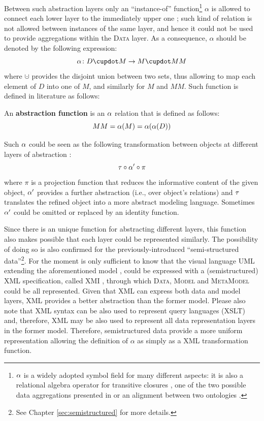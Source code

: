 Between such abstraction layers only an ``instance-of'' function\footnote{$\abstr$ is a widely adopted symbol field for many different aspects: it is also a relational algebra operator for transitive closures \cite{Alpha}, one of the two possible data aggregations presented in \cite{Johnson2011} or an alignment between two ontologies \cite{euzenat2013d}.} $\alpha$ is allowed to connect  each lower layer to the  immediately upper one \cite{mathmeta}; such kind of relation is not allowed  between instances of the same layer, and hence it could not be used to provide aggregations within the \textsc{Data} layer. As a consequence, $\alpha$ should be denoted by the following expression:
\[\abstr\colon \data\cupdot \model \to \model\cupdot \metamodel\]
where $\cupdot$ provides the disjoint union between two sets, thus allowing to map each element of $D$ into one of $M$, and similarly for $M$ and $MM$. Such function is defined in literature as follows:

\begin{definition}
	An \textbf{abstraction function} is an $\abstrTHIS$   relation that is
	defined as follows:
	\begin{equation}\label{eq:alayer}\metamodel=\abstr(\model)=\abstr(\abstr(\data))\end{equation}

	Such $\abstr$ could be seen as the following transformation between
	objects at different layers of abstraction \cite{kuhne06a}:
	\begin{equation}\label{eq:alpha}
	\ttransl \circ\abstr'\circ\pi
	\end{equation}
	where $\pi$ is a projection function that reduces the informative content of the
	given object, $\abstr'$ provides a further abstraction (i.e.,\; over object's
	relations) and $\ttransl$ translates the refined object into a more abstract
	modeling language. Sometimes \cite{kuhne06a} $\abstr'$ could be omitted or
	replaced by an identity function.
\end{definition}

Since there is an unique function for abstracting different layers, this function also makes possible that each layer could be represented similarly. The possibility of doing so is also confirmed for the previously-introduced  ``semi-structured data''\footnote{See Chapter \vref{sec:semistructured} for more details.}. For the moment is only sufficient to know that the visual language UML extending the aforementioned model \cite{OMG2011,OMG2011a}, could be expressed with a (semistructured) XML specification, called XMI \cite{XMI}, through which \textsc{Data}, \textsc{Model} and \textsc{MetaModel} could be all represented. Given that XML can express both data and model layers, XML provides a better abstraction than the former model. Please also note that XML syntax can be also used to represent query languages (XSLT) and, therefore, XML may be also used to represent all data representation layers in the former model. Therefore, semistructured data provide a more uniform representation allowing the definition of $\alpha$ as simply as a XML transformation function. 


